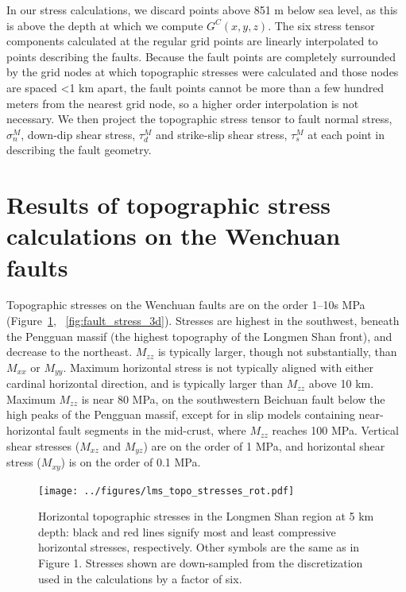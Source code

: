 \documentclass[twocolumn,jgrga]{AGUTeX}
\begin{document}
\begin{article}
In our stress calculations, we discard
points above 851 m below sea level, as this is above the depth at which
we compute $G^C(x,y,z)$. The six stress tensor components calculated at
the regular grid points are linearly interpolated to points describing
the faults. Because the fault points are completely surrounded by the
grid nodes at which topographic stresses were calculated and those nodes
are spaced \textless{}1 km apart, the fault points cannot be more than a
few hundred meters from the nearest grid node, so a higher order
interpolation is not necessary. We then project the topographic stress
tensor to fault normal stress, $\sigma_n^M$, down-dip shear stress,
$\tau_d^M$ and strike-slip shear stress, $\tau_s^M$ at each point in
describing the fault geometry.

\section{Results of topographic stress calculations on the Wenchuan
faults}\label{results-of-topographic-stress-calculations-on-the-wenchuan-faults}

Topographic stresses on the Wenchuan faults are on the order 1--10s MPa
(Figure~\ref{fig:lms_topo_stresses_rot}, ~\ref{fig:fault_stress_3d}). 
Stresses are highest in the southwest,
beneath the Pengguan massif (the highest topography of the Longmen Shan
front), and decrease to the northeast. $M_{zz}$ is typically larger,
though not substantially, than $M_{xx}$ or $M_{yy}$. Maximum horizontal
stress is not typically aligned with either cardinal horizontal
direction, and is typically larger than $M_{zz}$ above 10 km. Maximum
$M_{zz}$ is near 80 MPa, on the southwestern Beichuan fault below the
high peaks of the Pengguan massif, except for in slip models containing
near-horizontal fault segments in the mid-crust, where $M_{zz}$ reaches
100 MPa. Vertical shear stresses ($M_{xz}$ and $M_{yz}$) are on the
order of 1 MPa, and horizontal shear stress ($M_{xy}$) is on the order
of 0.1 MPa.

\begin{figure}[t]
\centering
\texttt{[image: ../figures/lms\_topo\_stresses\_rot.pdf]}
\caption{Horizontal topographic stresses in the Longmen Shan region at 5
km depth: black and red lines signify most and least compressive
horizontal stresses, respectively. Other symbols are the same as in Figure
1. Stresses shown are down-sampled from the
discretization used in the calculations by a factor of six.}
\label{fig:lms_topo_stresses_rot}
\end{figure}


\end{article}
\end{document}
